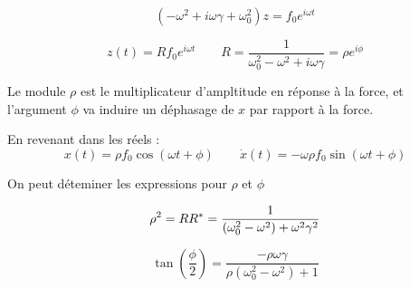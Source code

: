 \begin{equation}
    (-\omega^2 + i\omega\gamma + \omega_0^2)z = f_0 e^{i\omega t}
\end{equation}

\begin{equation}
    z(t) = R f_0 e^{i \omega t} \qquad R = \frac{1}{\omega_0^2 - \omega^2 + i\omega\gamma} = \rho e^{i\phi}
\end{equation}

Le module $\rho$ est le multiplicateur d’ampltitude en réponse à la force, et l’argument $\phi$ va induire un déphasage de $x$ par rapport à la force.

En revenant dans les réels :
\begin{equation}
    x(t) = \rho f_0 \cos(\omega t + \phi)
    \qquad \dot{x}(t) = -\omega \rho f_0 \sin(\omega t + \phi)
\end{equation}

On peut déteminer les expressions pour $\rho$ et $\phi$

\begin{dmath}
    \rho^2 = RR^* \\
    = \frac{1}{(\omega_0^2 - \omega^2) + \omega^2\gamma^2}
\end{dmath}

\begin{dmath}
    \tan(\frac{\phi}{2}) = \frac{-\rho\omega\gamma}{\rho(\omega_0^2 - \omega^2) + 1}
\end{dmath}

